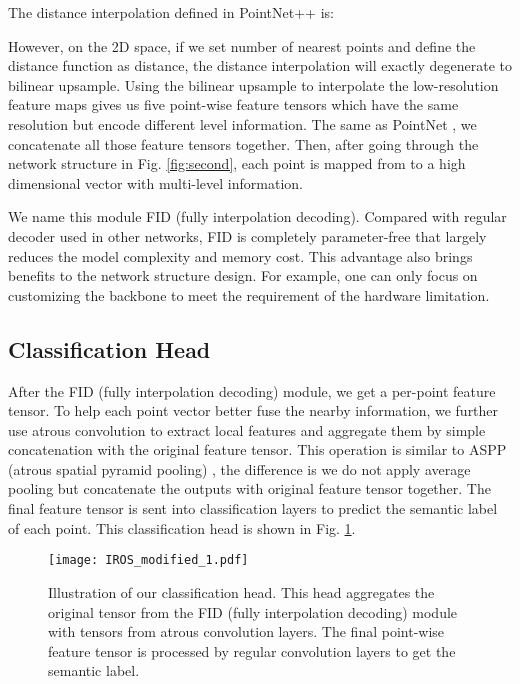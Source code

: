 \documentclass[letterpaper, 10 pt, conference]{ieeeconf}
\begin{document}
The distance interpolation defined in PointNet++ \cite{qi2017pointnet++} is:

However, on the 2D  space, if we set number of nearest points  and define the distance function  as  distance, the distance interpolation will exactly degenerate to bilinear upsample. Using the bilinear upsample to interpolate the low-resolution feature maps gives us five point-wise feature tensors which have the same resolution but encode different level information. The same as PointNet \cite{qi2017pointnet}, we concatenate all those feature tensors together. Then, after going through the network structure in Fig. \ref{fig:second}, each point is mapped from  to a high dimensional vector with multi-level information. 

We name this module FID (fully interpolation decoding). Compared with regular decoder used in other networks, FID is completely parameter-free that largely reduces the model complexity and memory cost. This advantage also brings benefits to the network structure design. For example, one can only focus on customizing the backbone to meet the requirement of the hardware limitation. 

\subsection{Classification Head}

After the FID (fully interpolation decoding) module, we get a per-point feature tensor. To help each point vector better fuse the nearby information, we further use atrous convolution to extract local features and aggregate them by simple concatenation with the original feature tensor. This operation is similar to ASPP (atrous spatial pyramid pooling) \cite{chen2017deeplab}, the difference is we do not apply average pooling but concatenate the outputs with original feature tensor together. The final feature tensor is sent into  classification layers to predict the semantic label of each point. This classification head is shown in Fig. \ref{fig:third}.

\begin{figure}
 \centering
\texttt{[image: IROS\_modified\_1.pdf]}
    \caption{Illustration of our classification head. This head aggregates the original tensor from the FID (fully interpolation decoding) module with tensors from atrous convolution layers. The final point-wise feature tensor is processed by regular  convolution layers to get the semantic label.  }
    \label{fig:third}
    \vspace{-3mm}
\end{figure}
\end{document}
